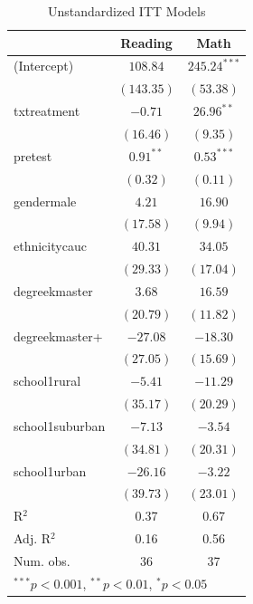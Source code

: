 \documentclass{article}\usepackage[]{graphicx}\usepackage[]{color}
\begin{document}
\begin{table}[h]
\begin{center}
\begin{tabular}{l c c }
\hline
                & Reading & Math \\
\hline
(Intercept)     & $108.84$    & $245.24^{***}$ \\
                & $(143.35)$  & $(53.38)$      \\
txtreatment     & $-0.71$     & $26.96^{**}$   \\
                & $(16.46)$   & $(9.35)$       \\
pretest         & $0.91^{**}$ & $0.53^{***}$   \\
                & $(0.32)$    & $(0.11)$       \\
gendermale      & $4.21$      & $16.90$        \\
                & $(17.58)$   & $(9.94)$       \\
ethnicitycauc   & $40.31$     & $34.05$        \\
                & $(29.33)$   & $(17.04)$      \\
degreekmaster   & $3.68$      & $16.59$        \\
                & $(20.79)$   & $(11.82)$      \\
degreekmaster+  & $-27.08$    & $-18.30$       \\
                & $(27.05)$   & $(15.69)$      \\
school1rural    & $-5.41$     & $-11.29$       \\
                & $(35.17)$   & $(20.29)$      \\
school1suburban & $-7.13$     & $-3.54$        \\
                & $(34.81)$   & $(20.31)$      \\
school1urban    & $-26.16$    & $-3.22$        \\
                & $(39.73)$   & $(23.01)$      \\
\hline
R$^2$           & 0.37        & 0.67           \\
Adj. R$^2$      & 0.16        & 0.56           \\
Num. obs.       & 36          & 37             \\
\hline
\multicolumn{3}{l}{\scriptsize{$^{***}p<0.001$, $^{**}p<0.01$, $^*p<0.05$}}
\end{tabular}
\caption{Unstandardized ITT Models}
\label{table:coefficients}
\end{center}
\end{table}
\end{document}
